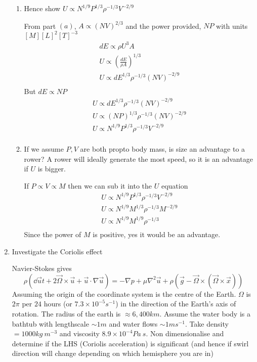 \documentclass{X:/Documents/Coding/Latex/myassignment}
\begin{document}
\begin{enumerate}
\begin{enumerate}
		\item Hence show $U \propto N^{1/9} P^{1/3} \rho^{-1/3} V^{-2/9}$

		From part $(a)$, $A \propto (NV)^{2/3}$ and the power provided, $NP$ with units $[M][L]^2[T]^{-3}$%
		\begin{align*}
			dE \propto \rho U^3 A\\
			U \propto \left(\frac{dE}{\rho A}\right)^{1/3}\\
			U \propto dE^{1/3} \rho^{-1/3} (NV)^{-2/9}\\
		\end{align*}
		But $dE \propto NP$
		\begin{align*}
			U \propto dE^{1/3} \rho^{-1/3} (NV)^{-2/9}\\
			U \propto (NP)^{1/3} \rho^{-1/3} (NV)^{-2/9}\\
			U \propto N^{1/9} P^{1/3} \rho^{-1/3} V^{-2/9}\\
		\end{align*}
		\item If we assume $P,V$ are both propto body mass, is size an advantage to a rower?
		A rower will ideally generate the most speed, so it is an advantage if $U$ is bigger.

		If $P\propto V \propto M$ then we can sub it into the $U$ equation
		\begin{align*}
			U \propto N^{1/9} P^{1/3} \rho^{-1/3} V^{-2/9}\\
			U \propto N^{1/9} M^{1/3} \rho^{-1/3} M^{-2/9}\\
			U \propto N^{1/9} M^{1/9} \rho^{-1/3} \\
		\end{align*}
		Since the power of $M$ is positive, yes it would be an advantage.

	\end{enumerate}







	\item Investigate the Coriolis effect 

	Navier-Stokes gives
	\[\rho \left(\dd{\vec u}{t} +  2\vec \Omega \times \vec u + \vec u \cdot \nabla \vec u\right) = - \nabla p + \mu \nabla^2 \vec u + \rho(\vec g - \vec \Omega \times (\vec\Omega \times \vec x))\] 
	Assuming the origin of the coordinate system is the centre of the Earth. $\Omega$ is $2\pi$ per $24$ hours (or $7.3 \times 10^{-5} s^{-1}$) in the direction of the Earth's axis of rotation.
	The radius of the earth is $\approx 6,400 km$.
	Assume the water body is a bathtub with lengthscale $\sim 1m$ and water flows $\sim 1ms^{-1}$. Take density $= 1000kg\ m^{-3}$ and viscosity $8.9\times 10^{-4} Pa\ s$.
	Non dimensionalise and determine if the LHS (Coriolis acceleration) is significant (and hence if swirl direction will change depending on which hemisphere you are in)
	

\end{enumerate}
\end{document}
